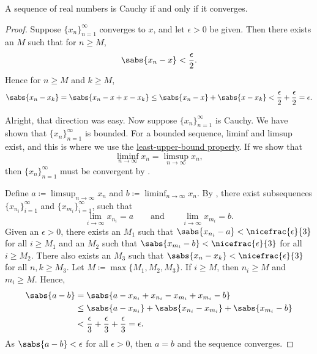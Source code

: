 \begin{thm}
A sequence of real numbers is Cauchy if and only if it converges.
\end{thm}

\begin{proof}
Suppose $\{ x_n \}_{n=1}^\infty$ converges to $x$,
and
let $\epsilon > 0$ be given.
Then there 
exists an $M$ such that for $n \geq M$,
\begin{equation*}
\sabs{x_n - x} < \frac{\epsilon}{2} .
\end{equation*}
Hence for $n \geq M$ and $k \geq M$,
\begin{equation*}
\sabs{x_n - x_k} = 
\sabs{x_n - x + x - x_k}
\leq \sabs{x_n-x} + \sabs{x-x_k} < \frac{\epsilon}{2} + \frac{\epsilon}{2} =
\epsilon .
\end{equation*}

Alright, that direction was easy.  Now suppose $\{ x_n \}_{n=1}^\infty$ is Cauchy.
We have shown that $\{ x_n \}_{n=1}^\infty$ is bounded.
For a bounded sequence, liminf and limsup exist, and this is
where we use the
\hyperref[defn:lub]{least-upper-bound property}.
If we show that
\begin{equation*}
\liminf_{n\to \infty} x_n = \limsup_{n\to\infty} x_n ,
\end{equation*}
then $\{ x_n \}_{n=1}^\infty$ must be convergent by .


Define $a \coloneqq \limsup_{n\to\infty} x_n$ and
$b \coloneqq \liminf_{n\to\infty} x_n$.
By , there exist subsequences
$\{ x_{n_i} \}_{i=1}^\infty$ and
$\{ x_{m_i} \}_{i=1}^\infty$, such that
\begin{equation*}
\lim_{i\to\infty} x_{n_i} = a
\qquad \text{and} \qquad
\lim_{i\to\infty} x_{m_i} = b.
\end{equation*}
Given an $\epsilon > 0$,
there exists an $M_1$ such that
$\sabs{x_{n_i} - a} < \nicefrac{\epsilon}{3}$ for all $i \geq M_1$
and an $M_2$ such that
$\sabs{x_{m_i} - b} < \nicefrac{\epsilon}{3}$ for all $i \geq M_2$.
There also exists an $M_3$
such that
$\sabs{x_n-x_k} < \nicefrac{\epsilon}{3}$
for all $n,k \geq M_3$.
Let $M \coloneqq \max \{ M_1, M_2, M_3 \}$.
If $i \geq M$, then $n_i \geq M$ and $m_i \geq M$.  Hence,
\begin{equation*}
\begin{split}
\sabs{a-b} & =
\sabs{a-x_{n_i}+x_{n_i}
-x_{m_i}+x_{m_i}
-b} \\
& \leq
\sabs{a-x_{n_i}}
+ \sabs{x_{n_i} -x_{m_i}}
+ \sabs{x_{m_i} -b} \\
& <
\frac{\epsilon}{3}
+
\frac{\epsilon}{3}
+
\frac{\epsilon}{3}
= \epsilon .
\end{split}
\end{equation*}
As $\sabs{a-b} < \epsilon$ for all $\epsilon > 0$, then $a=b$ and 
the sequence converges.
\end{proof}

